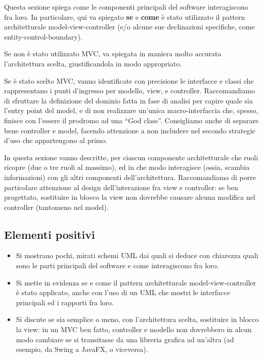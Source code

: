 \documentclass[a4paper,12pt]{report}
\begin{document}
Questa sezione spiega come le componenti principali del software interagiscono fra loro.
%
In particolare, qui va spiegato \textbf{se} e \textbf{come} è stato utilizzato il pattern
architetturale model-view-controller (e/o alcune sue declinazioni specifiche, come entity-control-boundary).

Se non è stato utilizzato MVC, va spiegata in maniera molto accurata l'architettura scelta, giustificandola in modo appropriato.

Se è stato scelto MVC, vanno identificate con precisione le interfacce e classi che rappresentano i punti d'ingresso per modello, view, e controller.
Raccomandiamo di sfruttare la definizione del dominio fatta in fase di analisi per capire quale sia l'entry point del model, e di non realizzare un'unica macro-interfaccia che, spesso, finisce con l'essere il prodromo ad una ``God class''.
%
Consigliamo anche di separare bene controller e model, facendo attenzione a non includere nel secondo strategie d'uso che appartengono al primo.

In questa sezione vanno descritte, per ciascun componente architetturale che ruoli ricopre (due o tre ruoli al massimo), ed in che modo interagisce (ossia, scambia informazioni) con gli altri componenti dell'architettura.
%
Raccomandiamo di porre particolare attenzione al design dell'interazione fra view e controller: se ben progettato, sostituire in blocco la view non dovrebbe causare alcuna modifica nel controller (tantomeno nel model).

\subsection*{Elementi positivi}
\begin{itemize}
 \item Si mostrano pochi, mirati schemi UML dai quali si deduce con chiarezza quali sono le parti principali del software e come interagiscono fra loro.
 \item Si mette in evidenza se e come il pattern architetturale model-view-controller è stato applicato, anche con l'uso di un UML che mostri le interfacce principali ed i rapporti fra loro.
 \item Si discute se sia semplice o meno, con l'architettura scelta, sostituire in blocco la view:
 	in un MVC ben fatto, controller e modello non dovrebbero in alcun modo cambiare se si transitasse da una libreria grafica ad un'altra (ad esempio, da Swing a JavaFX, o viceversa).
\end{itemize}
\end{document}
